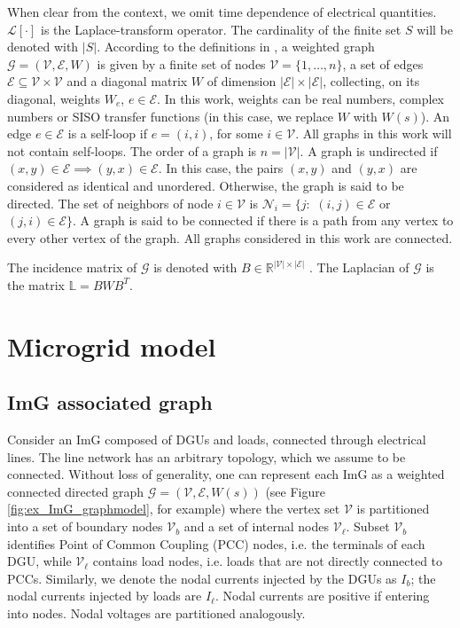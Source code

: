 \documentclass[a4paper]{article}
\theoremstyle{plain}
\def\Lset{\mathbb{L}}
\newcommand{\EE}{{\mathcal E}}
\newcommand{\GG}{{\mathcal G}}
\newcommand{\NN}{{\mathcal N}}
\newcommand{\VV}{{\mathcal V}}
\begin{document}
When clear from the context, we omit time dependence of electrical quantities. 
$\mathscr L[\cdot]$ is the Laplace-transform operator.
The cardinality of the finite set $S$ will be denoted with $|S|$. According to the definitions in \cite{bollobas1998modern}, a weighted graph $\mathcal G = (\mathcal V, \mathcal E, W)$ is given by a finite set of nodes $\mathcal V=\{1,\dots, n\}$, a set of edges $\mathcal E \subseteq  \mathcal V \times \mathcal V$ and a diagonal matrix $W$ of dimension $|\EE|\times|\EE|$, collecting, on its diagonal, weights $W_{e}$, $e\in\EE$. In this work, weights can be real numbers, complex numbers or SISO transfer functions (in this case, we replace $W$ with $W(s)$). An edge $e\in\EE$ is a self-loop if $e = (i,i)$, for some $i\in\VV$. All graphs in this work will not contain self-loops. The order of a graph is $n=|\VV|$.
A graph is undirected if $(x,y) \in \mathcal E \implies (y,x) \in \mathcal E$. In this case, the pairs $(x,y)$ and $(y,x)$ are considered as identical and unordered. Otherwise, the graph is said to be directed. The set of neighbors of node $i\in\VV$ is $\NN_i=\{j:$ $(i,j)\in\EE$ or $(j,i)\in\EE\}$. A graph is said to be connected if there is a path from any vertex to every other vertex of the graph. All graphs considered in this work are connected.

The incidence matrix of $\GG$ is denoted with $B\in \mathbb{R}^{|\VV|\times|\EE|}$ \cite{bollobas1998modern}. The Laplacian of $\GG$ is the matrix $\Lset = BWB^{T}$. 

     \section{Microgrid model}
     \label{sec:ImGmodel}
\subsection{ImG associated graph}
\label{sec:ImGgraph}
Consider an ImG composed of DGUs and loads, connected through electrical lines. The line network has an arbitrary topology, which we assume to be connected. Without loss of generality, one can represent each ImG as a weighted connected directed graph $\GG = (\VV,\EE,W(s))$ (see Figure \ref{fig:ex_ImG_graphmodel}, for example) where the vertex set $\VV$ is partitioned into a set of boundary nodes $\VV_{b}$ and a set of internal nodes $\VV_{\ell}$. Subset $\VV_b$ identifies Point of Common Coupling (PCC) nodes, i.e. the terminals of each DGU, while $\VV_{\ell}$ contains load nodes, i.e. loads that are not directly connected to PCCs. Similarly, we denote the nodal currents injected by the DGUs as $I_b$; the nodal currents injected by loads are $I_{\ell}$. Nodal currents are positive if entering into nodes. Nodal voltages are partitioned analogously. 
\end{document}
